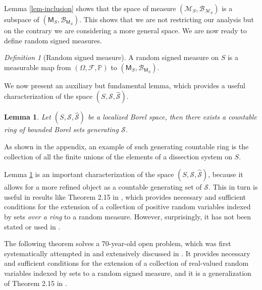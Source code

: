 \documentclass{article}
\theoremstyle{plain}
\newtheorem{lemma}[theorem]{Lemma}
\theoremstyle{remark}
\newtheorem{definition}[theorem]{Definition}
\begin{document}
Lemma \ref{lem-inclusion} shows that the space of measure $(\mathcal{M}_{S},\mathcal{B}_{\mathcal{M}_S})$ is a subspace of $(\mathsf{M}_{S},\mathcal{B}_{\mathsf{M}_S})$. This shows that we are not restricting our analysis but on the contrary we are considering a more general space. We are now ready to define random signed measures.
\begin{definition}[Random signed measure]  A random signed measure on $S$ is a measurable map from $(\Omega,\mathcal{F},\mathbb{P})$ to $(\mathsf{M}_{S},\mathcal{B}_{\mathsf{M}_S})$. 
\end{definition}



We now present an auxiliary but fundamental lemma, which provides a useful characterization of the space $(S,\mathcal{S},\hat{\mathcal{S}})$.

\begin{lemma}\label{lem-countable-ring-existence}
	Let $(S,\mathcal{S},\hat{\mathcal{S}})$ be a localized Borel space, then there exists a countable ring of bounded Borel sets generating $\mathcal{S}$.
\end{lemma}
As shown in the appendix, an example of such generating countable ring is the collection of all the finite unions of the elements of a dissection system on $S$. 

Lemma \ref{lem-countable-ring-existence} is an important characterization of the space $(S,\mathcal{S},\hat{\mathcal{S}})$, because it allows for a more refined object as a countable generating set of $\mathcal{S}$. This in turn is useful in results like Theorem 2.15 in \citet{Kallenberg2}, which provides necessary and sufficient conditions for the extension of a collection of positive random variables indexed by sets \textit{over a ring} to a random measure. However, surprisingly, it has not been stated or used in \citet{Kallenberg2}.


The following theorem solves a 70-year-old open problem, which was first systematically attempted in \citet{PrekopaI,PrekopaII,PrekopaIII} and extensively discussed in \citet{Daley}. It provides necessary and sufficient conditions for the extension of a collection of real-valued random variables indexed by sets to a random signed measure, and it is a generalization of Theorem 2.15 in \citet{Kallenberg2}.
\end{document}
